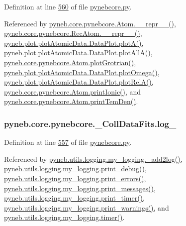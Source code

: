 Definition at line \hyperlink{pynebcore_8py_source_l00560}{560} of file \hyperlink{pynebcore_8py_source}{pynebcore.\+py}.



Referenced by \hyperlink{pynebcore_8py_source_l02544}{pyneb.\+core.\+pynebcore.\+Atom.\+\_\+\+\_\+repr\+\_\+\+\_\+()}, \hyperlink{pynebcore_8py_source_l03032}{pyneb.\+core.\+pynebcore.\+Rec\+Atom.\+\_\+\+\_\+repr\+\_\+\+\_\+()}, \hyperlink{plot_atomic_data_8py_source_l00116}{pyneb.\+plot.\+plot\+Atomic\+Data.\+Data\+Plot.\+plot\+A()}, \hyperlink{plot_atomic_data_8py_source_l00188}{pyneb.\+plot.\+plot\+Atomic\+Data.\+Data\+Plot.\+plot\+All\+A()}, \hyperlink{pynebcore_8py_source_l02372}{pyneb.\+core.\+pynebcore.\+Atom.\+plot\+Grotrian()}, \hyperlink{plot_atomic_data_8py_source_l00372}{pyneb.\+plot.\+plot\+Atomic\+Data.\+Data\+Plot.\+plot\+Omega()}, \hyperlink{plot_atomic_data_8py_source_l00261}{pyneb.\+plot.\+plot\+Atomic\+Data.\+Data\+Plot.\+plot\+Rel\+A()}, \hyperlink{pynebcore_8py_source_l02167}{pyneb.\+core.\+pynebcore.\+Atom.\+print\+Ionic()}, and \hyperlink{pynebcore_8py_source_l02253}{pyneb.\+core.\+pynebcore.\+Atom.\+print\+Tem\+Den()}.

\hypertarget{classpyneb_1_1core_1_1pynebcore_1_1___coll_data_fits_a42f3e78e841a8714f2602866843d77da}{}
\subsubsection[{log\+\_\+}]{\setlength{\rightskip}{0pt plus 5cm}pyneb.\+core.\+pynebcore.\+\_\+\+Coll\+Data\+Fits.\+log\+\_\+}\label{classpyneb_1_1core_1_1pynebcore_1_1___coll_data_fits_a42f3e78e841a8714f2602866843d77da}


Definition at line \hyperlink{pynebcore_8py_source_l00557}{557} of file \hyperlink{pynebcore_8py_source}{pynebcore.\+py}.



Referenced by \hyperlink{logging_8py_source_l00059}{pyneb.\+utils.\+logging.\+my\+\_\+logging.\+\_\+add2log()}, \hyperlink{logging_8py_source_l00157}{pyneb.\+utils.\+logging.\+my\+\_\+logging.\+print\+\_\+debug()}, \hyperlink{logging_8py_source_l00149}{pyneb.\+utils.\+logging.\+my\+\_\+logging.\+print\+\_\+errors()}, \hyperlink{logging_8py_source_l00133}{pyneb.\+utils.\+logging.\+my\+\_\+logging.\+print\+\_\+messages()}, \hyperlink{logging_8py_source_l00165}{pyneb.\+utils.\+logging.\+my\+\_\+logging.\+print\+\_\+timer()}, \hyperlink{logging_8py_source_l00141}{pyneb.\+utils.\+logging.\+my\+\_\+logging.\+print\+\_\+warnings()}, and \hyperlink{logging_8py_source_l00115}{pyneb.\+utils.\+logging.\+my\+\_\+logging.\+timer()}.

